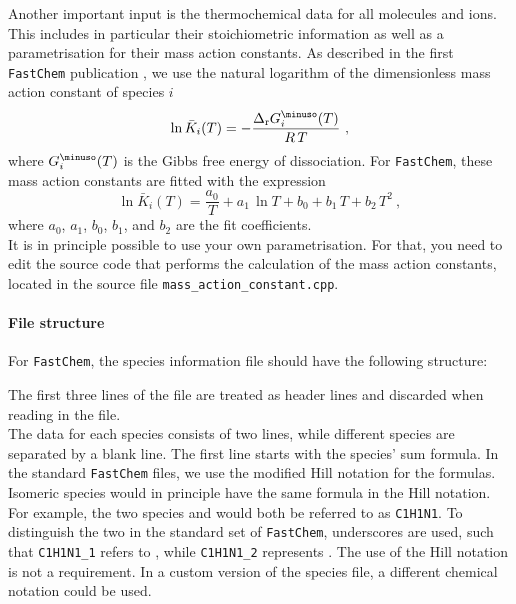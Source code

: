 \documentclass[numbers=noenddot]{fcmanual}
\let\ce\ch
\newcommand{\fc}{\texttt{FastChem}\xspace}
\begin{document}
Another important input is the thermochemical data for all molecules and ions. This includes in particular their stoichiometric information as well as a parametrisation for their mass action constants. As described in the first \fc publication \citep{Stock2018MNRAS.479..865S}, we use the natural logarithm of the dimensionless mass action constant of species $i$
\begin{equation}
\ln\bar{K}_i(T) = - \frac{\Delta_\mathrm{r} G_i^\minuso(T)}{R\,T} \ ,
\label{eq:lnK}
\end{equation}
where $G_i^\minuso(T)$ is the Gibbs free energy of dissociation. 
For \fc, these mass action constants are fitted with the expression
\begin{equation}
\ln\bar{K}_i(T) = \frac{a_0}{T} + a_1\,\ln T + b_0 + b_1\,T + b_2\,T^2 \ ,
\label{eq:fit}
\end{equation}
where $a_0$, $a_1$, $b_0$, $b_1$, and $b_2$ are the fit coefficients.\\
It is in principle possible to use your own parametrisation. For that, you need to edit the source code that performs the calculation of the mass action constants, located in the source file \verb|mass_action_constant.cpp|.

\paragraph{File structure}
For \fc, the species information file should have the following structure:

The first three lines of the file are treated as header lines and discarded when reading in the file. \\

The data for each species consists of two lines, while different species are separated by a blank line.
The first line starts with the species' sum formula. In the standard \fc files, we use the modified Hill notation for the formulas. Isomeric species would in principle have the same formula in the Hill notation. For example, the two species \ce{HCN} and \ce{HNC} would both be referred to as \texttt{C1H1N1}. To distinguish the two in the standard set of \fc, underscores are used, such that \texttt{C1H1N1\_1} refers to \ce{HCN}, while \texttt{C1H1N1\_2} represents \ce{HNC}.
The use of the Hill notation is not a requirement. In a custom version of the species file, a different chemical notation could be used.\\
\end{document}
